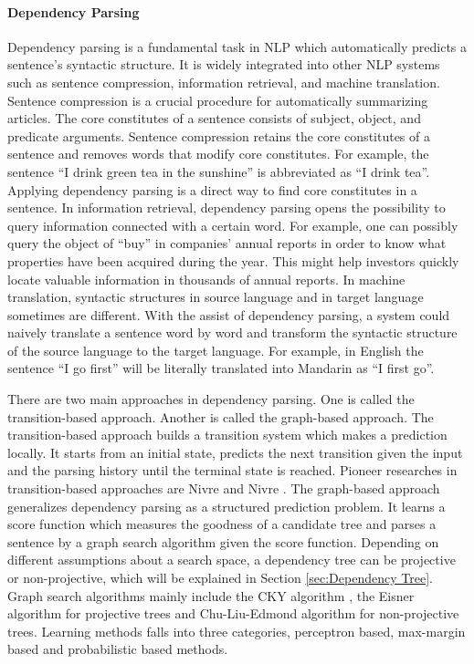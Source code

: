 \paragraph*{Dependency Parsing}
Dependency parsing is a fundamental task in NLP which automatically predicts a sentence's syntactic structure. It is widely integrated into other NLP systems such as sentence compression, information retrieval, and machine translation. Sentence compression is a crucial procedure for automatically summarizing articles. The core constitutes of a sentence consists of subject, object, and predicate arguments. Sentence compression retains the core constitutes of a sentence and removes words that modify core constitutes. For example, the sentence ``I drink green tea in the sunshine'' is abbreviated as ``I drink tea''. Applying dependency parsing is a direct way to find core constitutes in a sentence. In information retrieval, dependency parsing opens the possibility to query information connected with a certain word. For example, one can possibly query the object of ``buy'' in companies' annual reports in order to know what properties have been acquired during the year. This might help investors quickly locate valuable information in thousands of annual reports. In machine translation, syntactic structures in source language and in target language sometimes are different. With the assist of dependency parsing, a system could naively translate a sentence word by word and transform the syntactic structure of the source language to the target language. For example, in English the sentence ``I go first'' will be literally translated into Mandarin as ``I first go''. 

There are two main approaches in dependency parsing. One is called the transition-based approach. Another is called the graph-based approach. The transition-based approach builds a transition system which makes a prediction locally. It starts from an initial state, predicts the next transition given the input and the parsing history until the terminal state is reached. Pioneer researches in transition-based approaches are Nivre \cite{nivre2004incrementality} and Nivre \cite{nivre2008algorithms}. The graph-based approach generalizes dependency parsing as a structured prediction problem. It learns a score function which measures the goodness of a candidate tree and parses a sentence by a graph search algorithm given the score function. Depending on different assumptions about a search space, a dependency tree can be projective or non-projective, which will be explained in Section \ref{sec:Dependency Tree}.
Graph search algorithms mainly include the CKY algorithm \cite{younger1967recognition}, the Eisner algorithm \cite{eisner1996three} for projective trees and Chu-Liu-Edmond algorithm \cite{chu1965} for non-projective trees. Learning methods falls into three categories, perceptron based, max-margin based and probabilistic based methods. 

